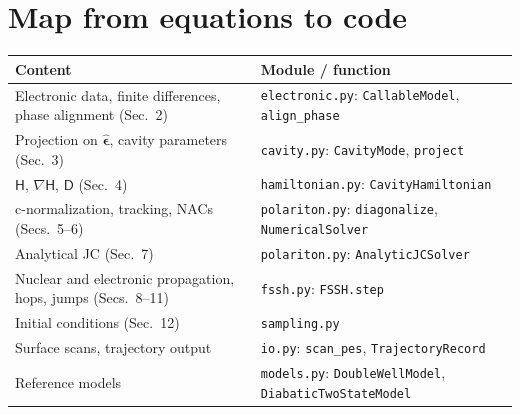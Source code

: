 \documentclass[11pt]{article}
\newcommand{\grad}{\nabla}
\newcommand{\eps}{\hat{\bm{\epsilon}}}
\newcommand{\Hm}{\mathsf{H}}
\newcommand{\Dm}{\mathsf{D}}
\newcommand{\code}[1]{\texttt{#1}}
\begin{document}
\section{Map from equations to code}
\begin{center}
\begin{tabular}{ll}
\toprule
Content & Module / function \\
\midrule
Electronic data, finite differences, phase alignment (Sec.~2) & \code{electronic.py}: \code{CallableModel}, \code{align\_phase}\\
Projection on $\eps$, cavity parameters (Sec.~3) & \code{cavity.py}: \code{CavityMode}, \code{project}\\
$\Hm$, $\grad\Hm$, $\Dm$ (Sec.~4) & \code{hamiltonian.py}: \code{CavityHamiltonian}\\
c-normalization, tracking, NACs (Secs.~5--6) & \code{polariton.py}: \code{diagonalize}, \code{NumericalSolver}\\
Analytical JC (Sec.~7) & \code{polariton.py}: \code{AnalyticJCSolver}\\
Nuclear and electronic propagation, hops, jumps (Secs.~8--11) & \code{fssh.py}: \code{FSSH.step}\\
Initial conditions (Sec.~12) & \code{sampling.py}\\
Surface scans, trajectory output & \code{io.py}: \code{scan\_pes}, \code{TrajectoryRecord}\\
Reference models & \code{models.py}: \code{DoubleWellModel}, \code{DiabaticTwoStateModel}\\
\bottomrule
\end{tabular}
\end{center}
\end{document}
